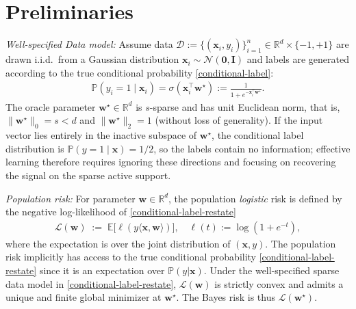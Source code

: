 \documentclass{article}
\theoremstyle{plain}
\theoremstyle{definition}
\theoremstyle{remark}
\begin{document}
\section{Preliminaries}

\textit{Well-specified Data model:} Assume data $\mathcal{D}:=\{(\mathbf{x}_{i},y_{i})\}_{i=1}^n \in \mathbb{R}^d \times \{-1, +1\}$ are drawn i.i.d.\ from a Gaussian distribution $\mathbf{x}_i \sim \mathcal{N}(\mathbf{0}, \mathbf{I})$ 
and labels are generated according to the true conditional probability \eqref{conditional-label}:
\begin{align}
    \label{conditional-label-restate}
\mathbb P(y_i = 1 \mid \mathbf x_i)
= \sigma(\mathbf x_i^\top \mathbf w^\star) :=\frac{1}{1+e^{-\mathbf x_i^\top \mathbf w^\star}}.
\end{align}
The oracle parameter $\mathbf w^\star \in \mathbb R^d$ is $s$-sparse and has unit Euclidean norm, that is,
$\|\mathbf w^\star\|_0 = s < d$ and $\|\mathbf w^\star\|_2 = 1$ (without loss of generality). If the input vector lies entirely in the inactive subspace of $\mathbf w^\star$, the conditional label distribution is $\mathbb P(y=1\mid \mathbf x)=1/2$, so the labels contain no information; effective learning therefore requires ignoring these directions and focusing on recovering the signal on the sparse active support.

\textit{Population risk:} For parameter $\mathbf{w} \in \mathbb{R}^d$, the population \textit{logistic} risk is defined by the negative log-likelihood of \eqref{conditional-label-restate}
\begin{align}
\mathcal{L}(\mathbf{w})
\;:=\;
\mathbb{E}
\big[\ell(y\langle \mathbf{x},\mathbf{w}\rangle)\big],
\quad 
\ell(t):=\log(1+e^{-t}),
\end{align}
where the expectation is over the joint distribution of $(\mathbf{x},y)$. The population risk implicitly has access to the true conditional probability \eqref{conditional-label-restate} since it is an expectation over $\mathbb P(y| \mathbf{x})$. 
Under the well-specified sparse data model in \eqref{conditional-label-restate}, $\mathcal{L}(\mathbf{w})$ is strictly convex and admits a unique and finite global minimizer at $\mathbf{w}^\star$. The Bayes risk is thus $\mathcal{L}(\mathbf{w}^{\star})$. 
\end{document}
